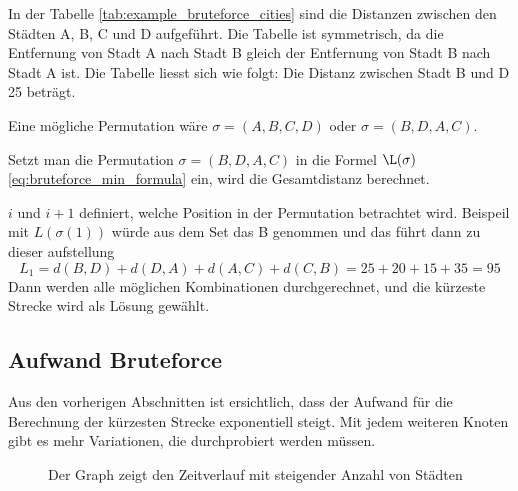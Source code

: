 In der Tabelle \ref{tab:example_bruteforce_cities} sind die Distanzen 
zwischen den Städten A, B, C und D aufgeführt. Die Tabelle ist symmetrisch, 
da die Entfernung von Stadt A nach Stadt B gleich der Entfernung von 
Stadt B nach Stadt A ist.
Die Tabelle liesst sich wie folgt: Die Distanz zwischen Stadt B und D 25 beträgt.

Eine mögliche Permutation wäre $\sigma = (A, B, C, D)$ oder $\sigma = (B, D, A, C)$.

Setzt man die Permutation $\sigma = (B, D, A, C)$ in die Formel $\L(\sigma)$
\ref{eq:bruteforce_min_formula} ein, wird die Gesamtdistanz berechnet.


\(i\) und \(i+1\) definiert, welche Position in der Permutation betrachtet wird. 
Beispeil mit \( L(\sigma(1)) \) würde aus dem Set das B genommen und das führt 
dann zu dieser aufstellung
\begin{equation}
    L_1 = d(B, D) + d(D, A) + d(A, C) + d(C, B)
    = 25 + 20 + 15 + 35 = 95
\end{equation}
Dann werden alle möglichen Kombinationen durchgerechnet, und die kürzeste 
Strecke wird als Lösung gewählt.

\subsection{Aufwand Bruteforce
\label{buch:paper:varalg:subsection:bruteforce_efforts}}
Aus den vorherigen Abschnitten ist ersichtlich, dass der Aufwand für die 
Berechnung der kürzesten Strecke exponentiell steigt. Mit jedem weiteren 
Knoten gibt es mehr Variationen, die durchprobiert werden müssen. 
\begin{figure}[h]
    \centering
    \caption{Der Graph zeigt den Zeitverlauf mit steigender Anzahl von Städten}
    \label{fig:bruteforce_graph_time}
\end{figure}

